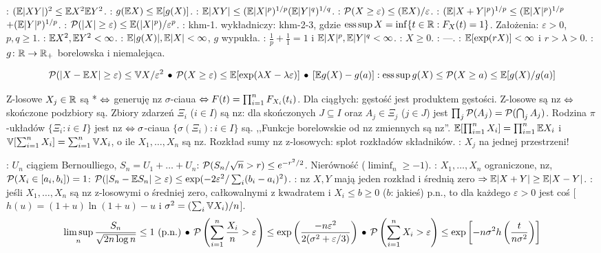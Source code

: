 {\raggedright
{}:  $(\mathbb{E} |XY|)^2 \le \mathbb{E} X^2 \mathbb{E} Y^2$.
: $g(\mathbb{E} X) \le \mathbb{E} [g(X)]$. 
: $\mathbb{E} |XY| \le (\mathbb{E} |X|^p)^{1/p} (\mathbb{E} |Y|^q)^{1/q}$.
: $\operatorname{\mathcal{P}}(X \ge \varepsilon) \le (\mathbb{E} X) / \varepsilon$.
: $(\mathbb{E} |X+Y|^p)^{1/p} \le (\mathbb{E} |X|^p)^{1/p}$ $+ (\mathbb{E} |Y|^p)^{1/p}$.  
: $\operatorname{\mathcal{P}}(|X| \ge \varepsilon) \le {\mathbb{E}(|X|^p)}/{\varepsilon^p}$.
: khm-1.
 wykładniczy: khm-2-3, gdzie $\operatorname{ess\,sup} X = \inf \{t \in \mathbb{R} : F_X(t) = 1\}$.
Założenia: $\varepsilon > 0$, $p,q \ge 1$.
: $\mathbb{E} X^2, \mathbb{E} Y^2 < \infty$. 
: $\mathbb{E} |g(X)|, \mathbb{E} |X| < \infty$, $g$ wypukła.
: $\frac{1}{p} + \frac{1}{1} = 1$ i $\mathbb{E} |X|^p, \mathbb{E} |Y|^q < \infty$. 
: $X \ge 0 $.
: ---. 
: $\mathbb{E} [\exp(rX)] < \infty$ i $r > \lambda > 0$. 
: $g \colon \mathbb{R} \to \mathbb{R}_+$ borelowska i niemalejąca.}
\[
	\operatorname{\mathcal{P}}(|X - \mathbb{E} X| \ge \varepsilon) \le {\mathbb{V}X}/{\varepsilon^2} \, \bullet \,
	\operatorname{\mathcal{P}}(X \ge \varepsilon) \le \mathbb{E} [\exp (\lambda X - \lambda \varepsilon)] \, \bullet \,
	[\mathbb{E} g(X) - g(a)] : {\operatorname{ess\,sup} g(X)} \le \operatorname{\mathcal{P}}(X \ge a) \le \mathbb{E} [{g(X)}/{g(a)}]
\]

Z-losowe  $X_j \in \mathbb{R}$ są * $\Leftrightarrow$ generuję nz $\sigma$-ciaua $\Leftrightarrow F(t) = \prod_{i=1}^n F_{X_i}(t_i)$.
Dla ciągłych: gęstość jest produktem gęstości.
Z-losowe są nz $\Leftrightarrow$ skończone podzbiory są.
Zbiory zdarzeń $\Xi_i$ ($i \in I$) są nz: dla skończonych $J \subseteq I$ oraz $A_j \in \Xi_j$ ($j \in J$) jest $\prod_{j} \operatorname{\mathcal{P}}(A_j) = \operatorname{\mathcal{P}} (\bigcap_{j}A_j)$.
Rodzina $\pi$-układów $\{\Xi_i : i \in I\}$ jest nz $\Leftrightarrow \sigma$-ciaua $\{\sigma(\Xi_i) : i \in I\}$ są.
,,Funkcje borelowskie od nz zmiennych są nz''.
$\mathbb{E} [\prod_{i=1}^n X_i] = \prod_{i=1}^n \mathbb{E} X_i$ i $\mathbb{V} [\sum_{i=1}^n X_i] = \sum_{i=1}^n \mathbb{V} X_i$, o ile $X_1, \dots, X_n$ są nz.
Rozkład sumy nz z-losowych: splot rozkładów składników.
\hfill *: $X_j$ na jednej przestrzeni!

: $U_n$ ciągiem Bernoulliego, $S_n = U_1 + \dots + U_n$: $\operatorname{\mathcal{P}} (S_n/\sqrt{n} > r) \le e^{-r^2/2}$.
Nierówność  ($\liminf_n \ge -1$).
: $X_1, \dots, X_n$ ograniczone, nz, $\operatorname{\mathcal{P}} (X_i \in [a_i, b_i]) =  1$: $\operatorname{\mathcal{P}}(|S_n - \mathbb{E} S_n| \ge \varepsilon) \le \exp(-2\varepsilon^2 / \sum_i (b_i-a_i)^2)$.
: nz $X, Y$ mają jeden rozkład i średnią zero $\Rightarrow \mathbb{E} |X+Y| \ge \mathbb{E} |X-Y|$.
: jeśli $X_1, \dots, X_n$ są nz z-losowymi o średniej zero, całkowalnymi z kwadratem i $X_i \le b \ge 0$ ($b$: jakieś) p.n., to dla każdego $\varepsilon > 0$ jest coś [$h(u) = (1+u)\ln(1+u) - u$ i $\sigma^2 = (\sum_i \mathbb{V} X_i)/n$].
\[
	\limsup_n \frac{S_n}{\sqrt{2n \log n}} \le 1 \text{ (p.n.)} \, \bullet \,
	\operatorname{\mathcal{P}} \left(\sum_{i=1}^n \frac{X_i}{n} > \varepsilon \right) \le \exp \left(\frac{-n\varepsilon^2}{2(\sigma^2 + \varepsilon/3)} \right) \, \bullet \,
	\operatorname{\mathcal{P}} \left(\sum_{i=1}^n {X_i} > \varepsilon \right) \le \exp \left[-n \sigma^2 h \left(\frac{t}{n \sigma^2}\right) \right]
\]


